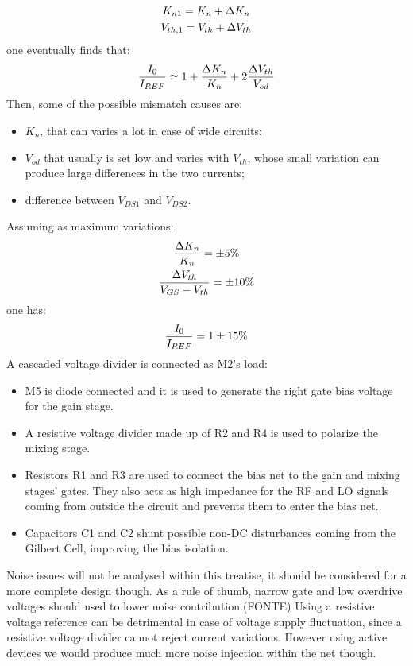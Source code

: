 \begin{gather}
K_{n1}=K_n+\Delta K_n \notag \\
V_{th,1} = V_{th}+\Delta V_{th} \notag
\end{gather}
one eventually finds that:
\begin{equation}
\frac{I_0}{I_{REF}} \simeq 1 + \frac{\Delta K_n}{K_n}+2\frac{\Delta V_{th}}{V_{od}} \notag
\end{equation}
Then, some of the possible mismatch causes are:
\begin{itemize}
	\item $K_n$, that can varies a lot in case of wide circuits;
	\item $V_{od}$ that usually is set low and varies with $V_{th}$, whose small variation can produce large differences in the two currents;
	\item difference between $V_{DS1}$ and $V_{DS2}$.
\end{itemize}
Assuming as maximum variations:
\begin{gather}
\frac{\Delta K_n}{K_n} = \pm 5 \% \notag \\
\frac{\Delta V_{th}}{V_{GS}-V_{th}} = \pm 10 \% \notag
\end{gather}
one has:
\begin{equation}
\frac{I_0}{I_{REF}} = 1 \pm 15 \% \notag
\end{equation}
A cascaded voltage divider is connected as M2's load: 
\begin{itemize}
	\item M5 is diode connected and it is used to generate the right gate bias voltage for the gain stage.
	\item A resistive voltage divider made up of R2 and R4 is used to polarize the mixing stage.
	\item Resistors R1 and R3 are used to connect the bias net to the gain and mixing stages' gates. They also acts as high impedance for the RF and LO signals coming from outside the circuit and prevents them to enter the bias net.
	\item Capacitors C1 and C2 shunt possible non-DC disturbances coming from the Gilbert Cell, improving the bias isolation.
\end{itemize}

Noise issues will not be analysed within this treatise, it should be considered for a more complete design though. As a rule of thumb, narrow gate and low overdrive voltages should used to lower noise contribution.(FONTE) 
Using a resistive voltage reference can be detrimental in case of voltage supply fluctuation, since a resistive voltage divider cannot reject current variations. However using active devices we would produce much more noise injection within the net though.

